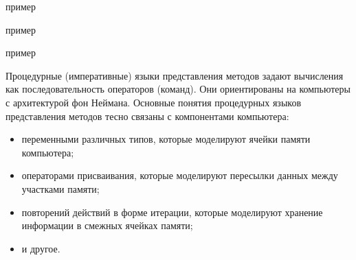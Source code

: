\begin{itemize}
\begin{SCn}
\begin{scnindent}
    \begin{scneqtoset}
        \begin{scnindent}
            \begin{scnhaselementrolelist}{пример}
            \end{scnhaselementrolelist}
        \end{scnindent}
        \begin{scnindent}
            \begin{scnhaselementrolelist}{пример}
            \end{scnhaselementrolelist}
        \end{scnindent}
        \begin{scnindent}
            \begin{scnhaselementrolelist}{пример}
            \end{scnhaselementrolelist}
        \end{scnindent}
    \end{scneqtoset}
\end{scnindent}
\end{SCn}

Процедурные (императивные) языки представления методов задают вычисления как последовательность операторов (команд).
Они ориентированы на компьютеры с архитектурой фон Неймана. Основные понятия процедурных языков представления методов
тесно связаны с компонентами компьютера:
\begin{itemize}
    \item переменными различных типов, которые моделируют ячейки памяти компьютера;
    \item операторами присваивания, которые моделируют пересылки данных между участками памяти;
    \item повторений действий в форме итерации, которые моделируют хранение информации в смежных ячейках памяти;
    \item и другое.
\end{itemize}


\end{itemize}
